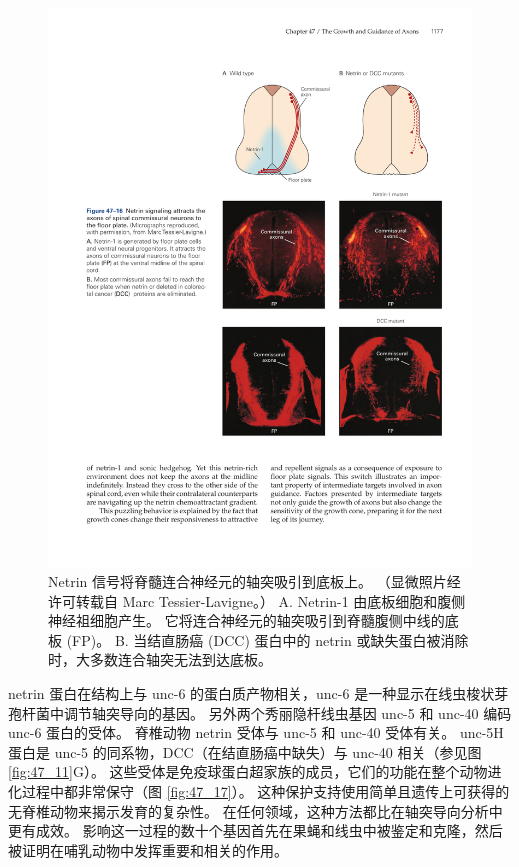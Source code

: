 \begin{figure}[htbp]
	\centering
	\includegraphics[width=0.65\linewidth]{chap47/fig_47_16}
	\caption{Netrin 信号将脊髓连合神经元的轴突吸引到底板上。 （显微照片经许可转载自 Marc Tessier-Lavigne。） A. Netrin-1 由底板细胞和腹侧神经祖细胞产生。 它将连合神经元的轴突吸引到脊髓腹侧中线的底板 (FP)。 B. 当结直肠癌 (DCC) 蛋白中的 netrin 或缺失蛋白被消除时，大多数连合轴突无法到达底板。}
	\label{fig:47_16}
\end{figure}

netrin 蛋白在结构上与 unc-6 的蛋白质产物相关，unc-6 是一种显示在线虫梭状芽孢杆菌中调节轴突导向的基因。 另外两个秀丽隐杆线虫基因 unc-5 和 unc-40 编码 unc-6 蛋白的受体。 脊椎动物 netrin 受体与 unc-5 和 unc-40 受体有关。 unc-5H 蛋白是 unc-5 的同系物，DCC（在结直肠癌中缺失）与 unc-40 相关（参见图 \ref{fig:47_11}G）。 
这些受体是免疫球蛋白超家族的成员，它们的功能在整个动物进化过程中都非常保守（图 \ref{fig:47_17}）。 
这种保护支持使用简单且遗传上可获得的无脊椎动物来揭示发育的复杂性。 在任何领域，这种方法都比在轴突导向分析中更有成效。 影响这一过程的数十个基因首先在果蝇和线虫中被鉴定和克隆，然后被证明在哺乳动物中发挥重要和相关的作用。

